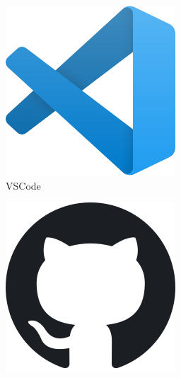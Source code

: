 \documentclass{mprop}
\begin{document}
\begin{figure}[h]
    \captionsetup{labelformat=empty}
    \centering
    \begin{subfigure}[b]{0.18\textwidth}
        \centering
        \includegraphics[width=\textwidth]{vscode_logo.png}
        \caption[]%
        {{\small VSCode}}    
    \end{subfigure}
    \hfill
    \begin{subfigure}[b]{0.18\textwidth}  
        \centering 
        \includegraphics[width=\textwidth]{github_logo.png}

\end{subfigure}
\end{figure}
\end{document}
